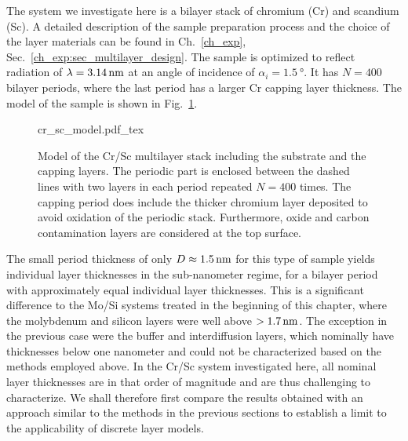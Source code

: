 The system we investigate here is a bilayer stack of chromium (Cr) and scandium (Sc). A detailed description of the sample preparation process and the choice of the layer materials can be found in Ch.~\ref{ch_exp}, Sec.~\ref{ch_exp:sec_multilayer_design}. The sample is optimized to reflect radiation of $\lambda = \nm{3.14}$ at an angle of incidence of $\alpha_i = \SI{1.5}{\degree}$. It has $N=400$ bilayer periods, where the last period has a larger Cr capping layer thickness. The model of the sample is shown in Fig.~\ref{ch_spec:fig_Cr_Sc_model}.
\begin{figure}[htbp]
    \def\svgwidth{0.7\textwidth}
    \selectfont\footnotesize
    {cr_sc_model.pdf_tex}
    \caption[Model of the Cr/Sc multilayer stack including the substrate and the capping layers.]{Model of the Cr/Sc multilayer stack including the substrate and the capping layers. The periodic part is enclosed between the dashed lines with two layers in each period repeated $N=400$ times. The capping period does include the thicker chromium layer deposited to avoid oxidation of the periodic stack. Furthermore, oxide and carbon contamination layers are considered at the top surface.}
    \label{ch_spec:fig_Cr_Sc_model}
\end{figure}
The small period thickness of only $D\approx\nm{1.5}$ for this type of sample yields individual layer thicknesses in the sub-nanometer regime, for a bilayer period with approximately equal individual layer thicknesses. This is a significant difference to the Mo/Si systems treated in the beginning of this chapter, where the molybdenum and silicon layers were well above $>\nm{1.7}$. The exception in the previous case were the buffer and interdiffusion layers, which nominally have thicknesses below one nanometer and could not be characterized based on the methods employed above. In the Cr/Sc system investigated here, all nominal layer thicknesses are in that order of magnitude and are thus challenging to characterize. We shall therefore first compare the results obtained with an approach similar to the methods in the previous sections to establish a limit to the applicability of discrete layer models.

